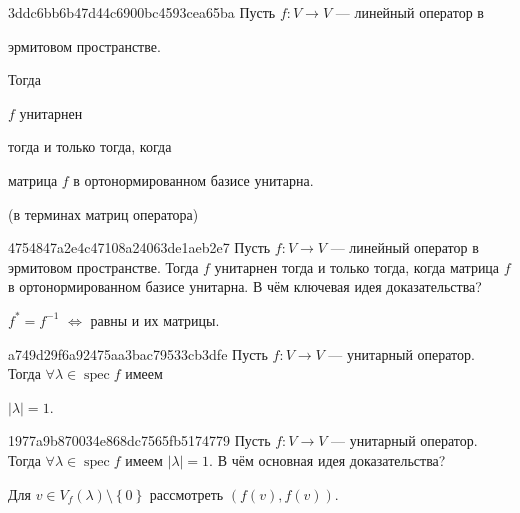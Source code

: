 \begin{note}{3ddc6bb6b47d44c6900bc4593cea65ba}
    Пусть \({ f : V \to V }\) --- линейный оператор в \begin{icloze}{3}эрмитовом пространстве.\end{icloze}
    Тогда \begin{icloze}{2}\({ f }\) унитарнен\end{icloze} тогда и только тогда, когда
    \begin{icloze}{1}матрица \({ f }\) в ортонормированном базисе унитарна.\end{icloze}

    \begin{center}
        \tiny
        (в терминах матриц оператора)
    \end{center}
\end{note}

\begin{note}{4754847a2e4c47108a24063de1aeb2e7}
    Пусть \({ f : V \to V }\) --- линейный оператор в эрмитовом пространстве.
    Тогда \({ f }\) унитарнен тогда и только тогда, когда
    матрица \({ f }\) в ортонормированном базисе унитарна.
    В чём ключевая идея доказательства?

    \begin{cloze}{1}
        \({ f^* = f^{-1} }\) \({ \iff }\) равны и их матрицы.
    \end{cloze}
\end{note}

\begin{note}{a749d29f6a92475aa3bac79533cb3dfe}
    Пусть \({ f : V \to V }\) --- унитарный оператор.
    Тогда \({ \forall \lambda \in \operatorname{spec} f }\) имеем \begin{icloze}{1}\({ \lvert \lambda \rvert = 1 }\).\end{icloze}
\end{note}

\begin{note}{1977a9b870034e868dc7565fb5174779}
    Пусть \({ f : V \to V }\) --- унитарный оператор.
    Тогда \({ \forall \lambda \in \operatorname{spec} f }\) имеем \({ \lvert \lambda \rvert = 1 }\).
    В чём основная идея доказательства?

    \begin{cloze}{1}
        Для \({ v \in V_f(\lambda) \setminus \left\{ 0 \right\} }\) рассмотреть \({ (f(v), f(v)) }\).
    \end{cloze}
\end{note}

